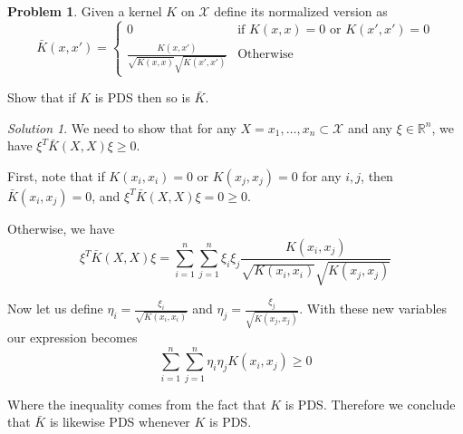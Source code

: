 \documentclass[12pt,a4paper]{article}
\theoremstyle{definition}
\newtheorem{problem}{Problem}
\theoremstyle{remark}
\newtheorem*{solution}{Solution}
\begin{document}
\begin{problem}
    Given a kernel $K$ on $\mathcal X$ define its normalized version as $$\bar K(x,x') = \begin{cases}
        0 & \text{if $K(x,x)=0$ or $K(x',x')=0$} \\
        \frac{K(x,x')}{\sqrt{K(x,x)}\sqrt{K(x',x')}} & \text{Otherwise}
    \end{cases}$$

    Show that if $K$ is PDS then so is $\bar K$. 
\end{problem}
\begin{solution}
    We need to show that for any $X={x_1, \dots, x_n} \subset \mathcal X$ and any $\xi \in \mathbb R^n$, we have $\xi^T \bar{K}(X,X) \xi \ge 0$.

    First, note that if $K(x_i, x_i) = 0$ or $K(x_j, x_j) = 0$ for any $i, j$, then $\bar{K}(x_i, x_j) = 0$, and $\xi^T \bar{K}(X,X) \xi = 0 \ge 0$. 

    Otherwise, we have $$\xi^T \bar{K}(X,X) \xi = \sum_{i=1}^n \sum_{j=1}^n \xi_i \xi_j \frac{K(x_i,x_j)}{\sqrt{K(x_i,x_i)}\sqrt{K(x_j,x_j)}}$$

    Now let us define $\eta_i = \frac{\xi_i}{\sqrt{K(x_i, x_i)}}$ and $\eta_j = \frac{\xi_j}{\sqrt{K(x_j,x_j)}}$. With these new variables our expression becomes $$\sum_{i=1}^n \sum_{j=1}^n \eta_i \eta_j K(x_i,x_j) \ge 0$$

    Where the inequality comes from the fact that $K$ is PDS. Therefore we conclude that $\bar K$ is likewise PDS whenever $K$ is PDS. 
\end{solution}
\end{document}
